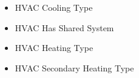 \begin{itemize}
\item HVAC Cooling Type
\item HVAC Has Shared System
\item HVAC Heating Type
\item HVAC Secondary Heating Type
\end{itemize}
